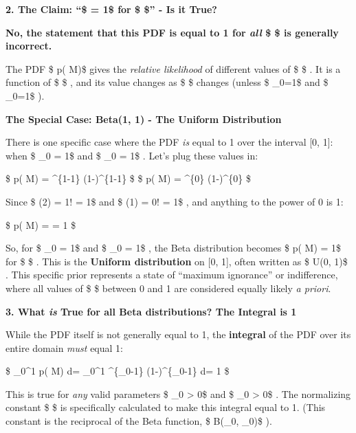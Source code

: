 \documentclass[11pt]{article}
\begin{document}
\textbf{2. The Claim: ``\$ = 1\$ for \$ \theta \in [0, 1] \$'' - Is it
True?}

\textbf{No, the statement that this PDF is equal to 1 for \emph{all} \$
\theta \in [0, 1]\$ is generally incorrect.}

The PDF \$ p(\theta \textbar{} M)\$ gives the \emph{relative likelihood}
of different values of \$ \theta\$ . It is a function of \$ \theta\$ ,
and its value changes as \$ \theta\$ changes (unless \$ \alpha\_0=1\$
and \$ \beta\_0=1\$ ).

\textbf{The Special Case: Beta(1, 1) - The Uniform Distribution}

There is one specific case where the PDF \emph{is} equal to 1 over the
interval {[}0, 1{]}: when \$ \alpha\_0 = 1\$ and \$ \beta\_0 = 1\$ .
Let's plug these values in:

\$ p(\theta \textbar{} M) = 
\theta\^{}\{1-1\} (1-\theta)\^{}\{1-1\} \$ \$ p(\theta \textbar{} M) =
 \theta\^{}\{0\} (1-\theta)\^{}\{0\}
\$

Since \$ \Gamma(2) = 1! = 1\$ and \$ \Gamma(1) = 0! = 1\$ , and anything
to the power of 0 is 1:

\$ p(\theta \textbar{} M) =    = 1 \$

So, for \$ \alpha\_0 = 1\$ and \$ \beta\_0 = 1\$ , the Beta distribution
becomes \$ p(\theta \textbar{} M) = 1\$ for \$ \theta \in [0, 1]\$ .
This is the \textbf{Uniform distribution} on {[}0, 1{]}, often written
as \$ U(0, 1)\$ . This specific prior represents a state of ``maximum
ignorance'' or indifference, where all values of \$ \theta\$ between 0
and 1 are considered equally likely \emph{a priori}.

\textbf{3. What \emph{is} True for all Beta distributions? The Integral
is 1}

While the PDF itself is not generally equal to 1, the \textbf{integral}
of the PDF over its entire domain \emph{must} equal 1:

\$ \int\_0\^{}1 p(\theta \textbar{} M) d\theta = \int\_0\^{}1
\theta\^{}\{\alpha\_0-1\} (1-\theta)\^{}\{\beta\_0-1\} d\theta = 1 \$

This is true for \emph{any} valid parameters \$ \alpha\_0 \textgreater{}
0\$ and \$ \beta\_0 \textgreater{} 0\$ . The normalizing constant \$
\$ is
specifically calculated to make this integral equal to 1. (This constant
is the reciprocal of the Beta function, \$ B(\alpha\_0, \beta\_0)\$ ).
\end{document}
